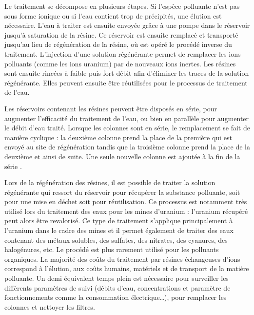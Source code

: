 \documentclass{article}
\begin{document}
Le traitement se décompose en plusieurs étapes. Si l’espèce polluante n’est pas sous forme ionique ou si l’eau contient trop de précipités, une élution est nécessaire. L’eau à traiter est ensuite envoyée grâce à une pompe dans le réservoir jusqu’à saturation de la résine. Ce réservoir est ensuite remplacé et transporté jusqu’au lieu de régénération de la résine, où est opéré le procédé inverse du traitement. L’injection d’une solution régénérante permet de remplacer les ions polluants (comme les ions uranium) par de nouveaux ions inertes. Les résines sont ensuite rincées à faible puis fort débit afin d’éliminer les traces de la solution régénérante. Elles peuvent ensuite être réutilisées pour le processus de traitement de l’eau.

Les réservoirs contenant les résines peuvent être disposés en série, pour augmenter l’efficacité du traitement de l’eau, ou bien en parallèle pour augmenter le débit d’eau traité. Lorsque les colonnes sont en série, le remplacement se fait de manière cyclique : la deuxième colonne prend la place de la première qui est envoyé au site de régénération tandis que la troisième colonne prend la place de la deuxième et ainsi de suite. Une seule nouvelle colonne est ajoutée à la fin de la série \cite{schick_informations_2020}.

Lors de la régénération des résines, il est possible de traiter la solution régénérante qui ressort du réservoir pour récupérer la substance polluante, soit pour une mise en déchet soit pour réutilisation. Ce processus est notamment très utilisé lors du traitement des eaux pour les mines d’uranium : l’uranium récupéré peut alors être revalorisé.
Ce type de traitement s’applique principalement à l’uranium dans le cadre des mines et il permet également de traiter des eaux contenant des métaux solubles, des sulfates, des nitrates, des cyanures, des halogénures, etc. Le procédé est plus rarement utilisé pour les polluants organiques.
La majorité des coûts du traitement par résines échangeuses d’ions correspond à l’élution, aux coûts humains, matériels et de transport de la matière polluante. Un demi équivalent temps plein est nécessaire pour surveiller les différents paramètres de suivi (débits d’eau, concentrations et paramètre de fonctionnements comme la consommation électrique…), pour remplacer les colonnes et nettoyer les filtres.


\end{document}
